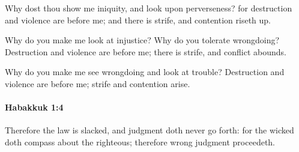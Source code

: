 			\begin{versebox}
					\item[BHS] 
					\item[LXX] 
					\item[ASV] Why dost thou show me iniquity, and look upon perverseness? for destruction and violence are before me; and there is strife, and contention riseth up.
					\item[NIV] Why do you make me look at injustice? Why do you tolerate wrongdoing? Destruction and violence are before me; there is strife, and conflict abounds.
					\item[NRSV] Why do you make me see wrongdoing and look at trouble? Destruction and violence are before me; strife and contention arise.
			\end{versebox}

		\paragraph{Habakkuk 1:4} %
			\label{HABAKKUK-1-4}

			Therefore the law is slacked, and judgment doth never go forth: for the wicked doth compass about the righteous; therefore wrong judgment proceedeth.

